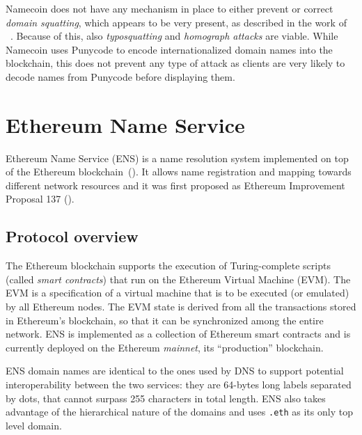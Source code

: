 \documentclass[mscthesis]{usiinfthesis}
\begin{document}
Namecoin does not have any mechanism in place to either prevent or correct \emph{domain squatting}, which appears to be very present, as described in the work of ~\cite{kalodner2015empirical}. Because of this, also \emph{typosquatting} and \emph{homograph attacks} are viable. While Namecoin uses Punycode to encode internationalized domain names into the blockchain, this does not prevent any type of attack as clients are very likely to decode names from Punycode before displaying them.

\section{Ethereum Name Service}\label{proj:ens}

Ethereum Name Service (ENS) is a name resolution system implemented on top of the Ethereum blockchain~(\cite{wood2014ethereum}). It allows name registration and mapping towards different network resources and it was first proposed as Ethereum Improvement Proposal 137 (\cite{eip:137}).

\subsection{Protocol overview}

The Ethereum blockchain supports the execution of Turing-complete scripts (called \emph{smart contracts}) that run on the Ethereum Virtual Machine (EVM). The EVM is a specification of a virtual machine that is to be executed (or emulated) by all Ethereum nodes. The EVM state is derived from all the transactions stored in Ethereum's blockchain, so that it can be synchronized among the entire network. ENS is implemented as a collection of Ethereum smart contracts and is currently deployed on the Ethereum \textit{mainnet}, its ``production'' blockchain.

ENS domain names are identical to the ones used by DNS to support potential interoperability between the two services: they are 64-bytes long labels separated by dots, that cannot surpass 255 characters in total length. ENS also takes advantage of the hierarchical nature of the domains and uses \texttt{.eth} as its only top level domain.
\end{document}
